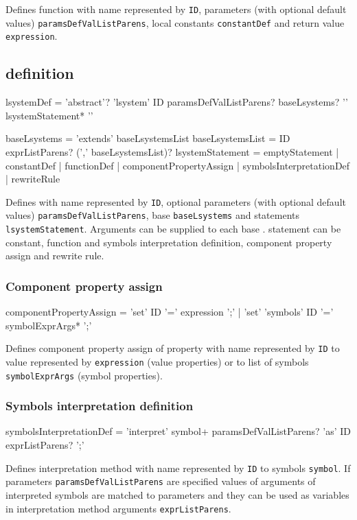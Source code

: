 Defines function with name represented by \texttt{ID}, parameters (with optional default values) \texttt{paramsDefValListParens},
	local constants \texttt{constantDef} and return value \texttt{expression}.


\subsection{\lsystem definition}
\begin{Grammar}
lsystemDef = 'abstract'? 'lsystem' ID paramsDefValListParens?
	baseLsystems? '{' lsystemStatement* '}'

baseLsystems = 'extends' baseLsystemsList
baseLsystemsList = ID exprListParens? (',' baseLsystemsList)?
lsystemStatement = emptyStatement
	| constantDef
	| functionDef
	| componentPropertyAssign
	| symbolsInterpretationDef
	| rewriteRule
\end{Grammar}

Defines \lsystem with name represented by \texttt{ID}, optional parameters (with optional default values) \texttt{paramsDefValListParens},
	base \lsystems \texttt{baseLsystems} and \lsystem statements \texttt{lsystemStatement}.
Arguments can be supplied to each base \lsystem.
\lsystem statement can be constant, function and symbols interpretation definition, component property assign and rewrite rule.


\subsubsection{Component property assign}
\begin{Grammar}
componentPropertyAssign = 'set' ID '=' expression ';'
	| 'set' 'symbols' ID '=' symbolExprArgs* ';'
\end{Grammar}

Defines component property assign of property with name represented by \texttt{ID} to value represented by \texttt{expression} (value properties)
	or to list of symbols \texttt{symbolExprArgs} (symbol properties). 


\subsubsection{Symbols interpretation definition}
\begin{Grammar}
symbolsInterpretationDef = 'interpret'
	symbol+ paramsDefValListParens? 'as' ID exprListParens? ';'
\end{Grammar}

Defines interpretation method with name represented by \texttt{ID} to symbols \texttt{symbol}.
If parameters \texttt{paramsDefValListParens} are specified values of arguments of interpreted symbols are matched to parameters and they can be used as variables in interpretation method arguments \texttt{exprListParens}.



